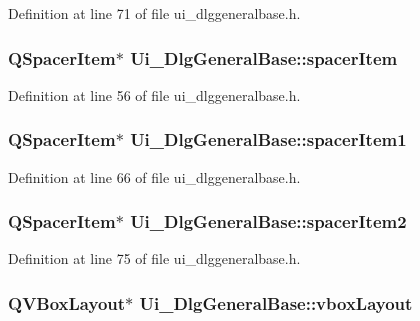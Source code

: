 Definition at line 71 of file ui\+\_\+dlggeneralbase.\+h.

\hypertarget{classUi__DlgGeneralBase_ac1694bcde138dc57b7fd0a63e778ccc2}{
\subsubsection[{spacer\+Item}]{\setlength{\rightskip}{0pt plus 5cm}Q\+Spacer\+Item$\ast$ Ui\+\_\+\+Dlg\+General\+Base\+::spacer\+Item}}\label{classUi__DlgGeneralBase_ac1694bcde138dc57b7fd0a63e778ccc2}


Definition at line 56 of file ui\+\_\+dlggeneralbase.\+h.

\hypertarget{classUi__DlgGeneralBase_a226899c716df5b8ce150c996cd8059c4}{
\subsubsection[{spacer\+Item1}]{\setlength{\rightskip}{0pt plus 5cm}Q\+Spacer\+Item$\ast$ Ui\+\_\+\+Dlg\+General\+Base\+::spacer\+Item1}}\label{classUi__DlgGeneralBase_a226899c716df5b8ce150c996cd8059c4}


Definition at line 66 of file ui\+\_\+dlggeneralbase.\+h.

\hypertarget{classUi__DlgGeneralBase_ab4e46a31ba4402dd7204018103a9e68c}{
\subsubsection[{spacer\+Item2}]{\setlength{\rightskip}{0pt plus 5cm}Q\+Spacer\+Item$\ast$ Ui\+\_\+\+Dlg\+General\+Base\+::spacer\+Item2}}\label{classUi__DlgGeneralBase_ab4e46a31ba4402dd7204018103a9e68c}


Definition at line 75 of file ui\+\_\+dlggeneralbase.\+h.

\hypertarget{classUi__DlgGeneralBase_ad85268c43c0919c56230704be03f092c}{
\subsubsection[{vbox\+Layout}]{\setlength{\rightskip}{0pt plus 5cm}Q\+V\+Box\+Layout$\ast$ Ui\+\_\+\+Dlg\+General\+Base\+::vbox\+Layout}}\label{classUi__DlgGeneralBase_ad85268c43c0919c56230704be03f092c}


